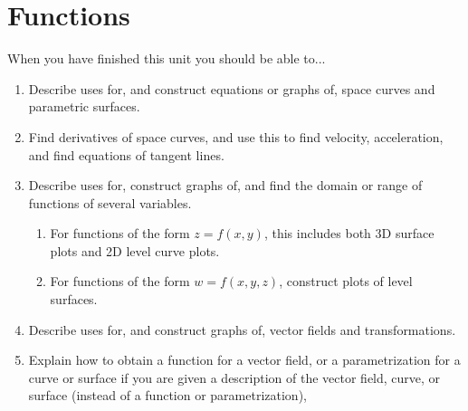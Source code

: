 \documentclass[10pt,]{book}
\theoremstyle{plain}
\theoremstyle{definition}
\theoremstyle{definition}
\theoremstyle{definition}
\theoremstyle{definition}
\theoremstyle{definition}
\numberwithin{equation}{section}
\begin{document}
\chapter[{Functions}]{Functions}\label{chapter-6}
%
\par
When you have finished this unit you should be able to...%
\leavevmode%
\begin{enumerate}
\item\hypertarget{li-46}{}Describe uses for, and construct equations or graphs of, space curves and parametric surfaces.%
\item\hypertarget{li-47}{}Find derivatives of space curves, and use this to find velocity, acceleration, and find equations of tangent lines.%
\item\hypertarget{li-48}{}Describe uses for, construct graphs of, and find the domain or range of functions of several variables.%
%
\begin{enumerate}
\item\hypertarget{li-49}{}For functions of the form \(z=f(x,y)\), this includes both 3D surface plots and 2D level curve plots.%
\item\hypertarget{li-50}{}For functions of the form \(w=f(x,y,z)\), construct plots of level surfaces.%
\end{enumerate}
\item\hypertarget{li-51}{}Describe uses for, and construct graphs of, vector fields and transformations.%
\item\hypertarget{li-52}{}Explain how to obtain a function for a vector field, or a parametrization for a curve or surface if you are given a description of the vector field, curve, or surface (instead of a function or parametrization),%
\end{enumerate}
\typeout{************************************************}
\typeout{************************************************}
\end{document}
